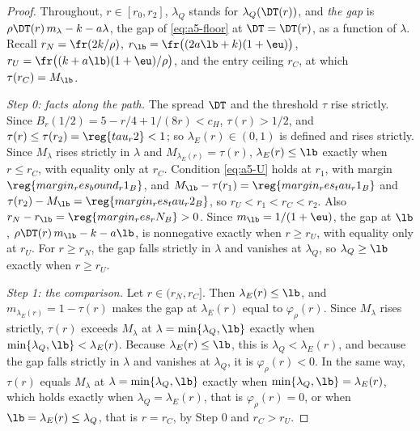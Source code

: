 \begin{proof}
Throughout, \(r\in[r_0,r_2]\), \(\lambda_Q\) stands for \(\lambda_Q(\DT(r))\), and \emph{the gap} is
\(\rho\DT(r)\,m_\lambda-k-a\lambda\), the gap of \eqref{eq:a5-floor} at \(\DT=\DT(r)\), as a function of \(\lambda\).
Recall \(r_N=\fr(2k/\rho)\), \(r_{\lb}=\fr\bigl((2a\lb+k)(1+\eu)\bigr)\),
\(r_U=\fr\bigl((k+a\lb)(1+\eu)/\rho\bigr)\), and the entry ceiling \(r_C\), at which \(\tau(r_C)=M_{\lb}\).

\emph{Step 0: facts along the path.} The spread \(\DT\) and the threshold \(\tau\) rise strictly. Since
\(B_r(1/2)=5-r/4+1/(8r)<c_H\), \(\tau(r)>1/2\), and \(\tau(r)\le\tau(r_2)=\reg{tau_r2}<1\); so \(\lambda_E(r)\in(0,1)\)
is defined and rises strictly. Since \(M_\lambda\) rises strictly in \(\lambda\) and \(M_{\lambda_E(r)}=\tau(r)\),
\(\lambda_E(r)\le\lb\) exactly when \(r\le r_C\), with equality only at \(r_C\). Condition \eqref{eq:a5-U} holds at
\(r_1\), with margin \(\reg{margin_res_bound_r1_B}\), and \(M_{\lb}-\tau(r_1)=\reg{margin_res_tau_r1_B}\) and
\(\tau(r_2)-M_{\lb}=\reg{margin_res_tau_r2_B}\), so \(r_U<r_1<r_C<r_2\). Also \(r_N-r_{\lb}=\reg{margin_res_rN_B}>0\).
Since \(m_{\lb}=1/(1+\eu)\), the gap at \(\lb\), \(\rho\DT(r)\,m_{\lb}-k-a\lb\), is nonnegative exactly when
\(r\ge r_U\), with equality only at \(r_U\). For \(r\ge r_N\), the gap falls strictly in \(\lambda\) and vanishes at
\(\lambda_Q\), so \(\lambda_Q\ge\lb\) exactly when \(r\ge r_U\).

\emph{Step 1: the comparison.} Let \(r\in(r_N,r_C]\). Then \(\lambda_E(r)\le\lb\), and \(m_{\lambda_E(r)}=1-\tau(r)\)
makes the gap at \(\lambda_E(r)\) equal to \(\varphi_\rho(r)\). Since \(M_\lambda\) rises strictly, \(\tau(r)\)
exceeds \(M_\lambda\) at \(\lambda=\min\{\lambda_Q,\lb\}\) exactly when \(\min\{\lambda_Q,\lb\}<\lambda_E(r)\). Because
\(\lambda_E(r)\le\lb\), this is \(\lambda_Q<\lambda_E(r)\), and because the gap falls strictly in \(\lambda\) and
vanishes at \(\lambda_Q\), it is \(\varphi_\rho(r)<0\). In the same way, \(\tau(r)\) equals \(M_\lambda\) at
\(\lambda=\min\{\lambda_Q,\lb\}\) exactly when \(\min\{\lambda_Q,\lb\}=\lambda_E(r)\), which holds exactly when
\(\lambda_Q=\lambda_E(r)\), that is \(\varphi_\rho(r)=0\), or when \(\lb=\lambda_E(r)\le\lambda_Q\), that is \(r=r_C\),
by Step 0 and \(r_C>r_U\).


\end{proof}
